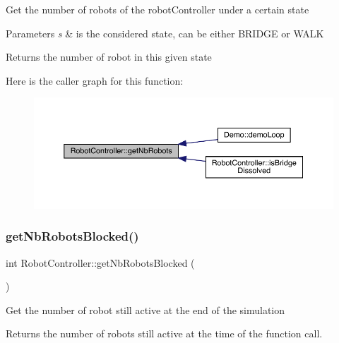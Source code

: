 Get the number of robots of the robot\+Controller under a certain state 
\begin{DoxyParams}{Parameters}
{\em s} & is the considered state, can be either B\+R\+I\+D\+GE or W\+A\+LK \\
\hline
\end{DoxyParams}
\begin{DoxyReturn}{Returns}
the number of robot in this given state 
\end{DoxyReturn}
Here is the caller graph for this function\+:\nopagebreak
\begin{figure}[H]
\begin{center}
\leavevmode
\includegraphics[width=350pt]{class_robot_controller_a612d9355c9638b9f0bb24348647ada45_icgraph}
\end{center}
\end{figure}
\mbox{\label{class_robot_controller_a83a58bbd6f7fbafb3038ec0cb6271fda}} 
\subsubsection{\texorpdfstring{get\+Nb\+Robots\+Blocked()}{getNbRobotsBlocked()}}
{\footnotesize\ttfamily int Robot\+Controller\+::get\+Nb\+Robots\+Blocked (\begin{DoxyParamCaption}{ }\end{DoxyParamCaption})}

Get the number of robot still active at the end of the simulation \begin{DoxyReturn}{Returns}
the number of robots still active at the time of the function call. 
\end{DoxyReturn}
\mbox{\label{class_robot_controller_ae421f813b81632c35ec3494717fd0f12}} 

